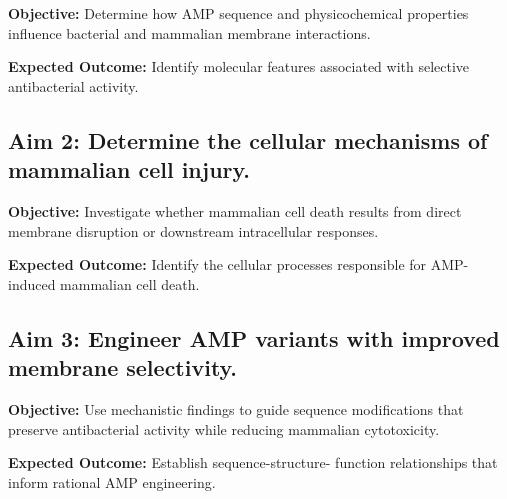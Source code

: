 \documentclass[11pt]{article}
\begin{document}
\textbf{Objective:} Determine how AMP sequence and
physicochemical properties influence bacterial and
mammalian membrane interactions.

\textbf{Expected Outcome:} Identify molecular features
associated with selective antibacterial activity.


\subsection*{Aim 2: Determine the cellular mechanisms
of mammalian cell injury.}

\textbf{Objective:} Investigate whether mammalian cell
death results from direct membrane disruption or
downstream intracellular responses.

\textbf{Expected Outcome:} Identify the cellular processes
responsible for AMP-induced mammalian cell death.


\subsection*{Aim 3: Engineer AMP variants with improved
membrane selectivity.}

\textbf{Objective:} Use mechanistic findings to guide
sequence modifications that preserve antibacterial
activity while reducing mammalian cytotoxicity.

\textbf{Expected Outcome:} Establish sequence-structure-
function relationships that inform rational AMP engineering.
\end{document}
